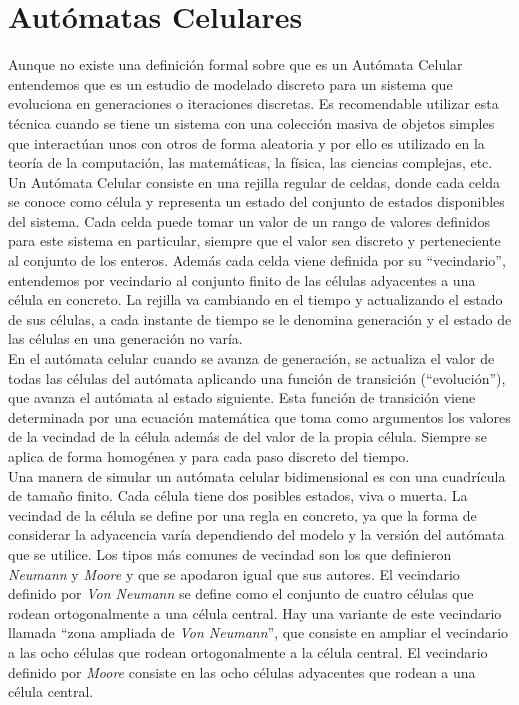 \section{Autómatas Celulares}
Aunque no existe una definición formal sobre que es un Autómata Celular entendemos que es un estudio de modelado discreto para un sistema que evoluciona en generaciones o iteraciones discretas. Es recomendable utilizar esta técnica cuando se tiene un sistema con una colección masiva de objetos simples que interactúan unos con otros de forma aleatoria y por ello es utilizado en la teoría de la computación, las matemáticas, la física, las ciencias complejas, etc. \\

Un Autómata Celular consiste en una rejilla regular de celdas, donde cada celda se conoce como célula y representa un estado del conjunto de estados disponibles del sistema. Cada celda puede tomar un valor de un rango de valores definidos para este sistema en particular, siempre que el valor sea discreto y perteneciente al conjunto de los enteros. Además cada celda viene definida por su ``vecindario'', entendemos por vecindario al conjunto finito de las células adyacentes a una célula en concreto.  La rejilla va cambiando en el tiempo y actualizando el estado de sus células, a cada instante de tiempo se le denomina generación y el estado de las células en una generación no varía.  \\


En el autómata celular cuando se avanza de generación, se actualiza el valor de todas las células del autómata aplicando una función de transición (``evolución''), que avanza el autómata al estado siguiente. Esta función de transición viene determinada por una ecuación matemática que toma como argumentos los valores de la vecindad de la célula además de del valor de la propia célula. Siempre se aplica de forma homogénea y para cada paso discreto del tiempo.\\

Una manera de simular un autómata celular bidimensional es con una cuadrícula de tamaño finito. Cada célula tiene dos posibles estados, viva o muerta. La vecindad de la célula se define por una regla en concreto, ya que la forma de considerar la adyacencia varía dependiendo del modelo y la versión del autómata que se utilice. Los tipos más comunes de vecindad son los que definieron \textit{Neumann} y \textit{Moore} y que se apodaron igual que sus autores. El vecindario definido por \textit{Von Neumann} se define como el conjunto de cuatro células que rodean ortogonalmente a una célula central. Hay una variante de este vecindario llamada ``zona ampliada de \textit{Von Neumann}'', que consiste en ampliar el vecindario a las ocho células que rodean ortogonalmente a la célula central. El vecindario definido por \textit{Moore} consiste en las ocho células adyacentes que rodean a una célula central.\\


